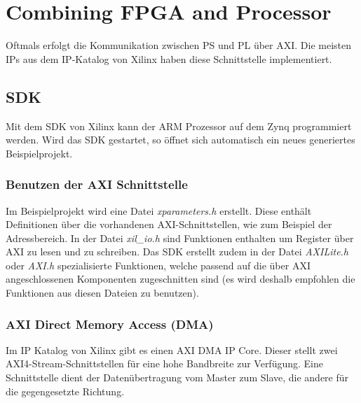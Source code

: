 \section{Combining FPGA and Processor}
Oftmals erfolgt die Kommunikation zwischen PS und PL über AXI. Die meisten IPs aus dem IP-Katalog von Xilinx haben diese Schnittstelle implementiert.

\subsection{SDK}
Mit dem SDK von Xilinx kann der ARM Prozessor auf dem Zynq programmiert werden. Wird das SDK gestartet, so öffnet sich automatisch ein neues generiertes Beispielprojekt.

\subsubsection{Benutzen der AXI Schnittstelle}
Im Beispielprojekt wird eine Datei \textit{xparameters.h} erstellt. Diese enthält Definitionen über die vorhandenen AXI-Schnittstellen, wie zum Beispiel der Adressbereich. In der Datei \textit{xil\_io.h} sind Funktionen enthalten um Register über AXI zu lesen und zu schreiben. Das SDK erstellt zudem in der Datei \textit{AXILite.h} oder \textit{AXI.h} spezialisierte Funktionen, welche passend auf die über AXI angeschlossenen Komponenten zugeschnitten sind (es wird deshalb empfohlen die Funktionen aus diesen Dateien zu benutzen).


\subsubsection{AXI Direct Memory Access (DMA)}
Im IP Katalog von Xilinx gibt es einen AXI DMA IP Core. Dieser stellt zwei AXI4-Stream-Schnittstellen für eine hohe Bandbreite zur Verfügung. Eine Schnittstelle dient der Datenübertragung vom Master zum Slave, die andere für die gegengesetzte Richtung.

